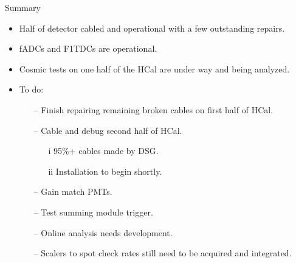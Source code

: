 \documentclass[10pt]{beamer}
\begin{document}
\begin{frame}{Summary}

	\begin{itemize}
		\item Half of detector cabled and operational with a few outstanding repairs.
		\item {}\alert{fADCs and F1TDCs are operational}.
		\item {}\alert{Cosmic tests} on one half of the HCal are under way and being analyzed.
		\item {}\alert{To do}:
		\begin{itemize}
			\item[--] Finish repairing remaining broken cables on first half of HCal.
			\item[--] Cable and debug second half of HCal.
				\begin{itemize}
					\item[i] 95\%+ cables made by DSG.
					\item[ii] Installation to begin shortly.
				\end{itemize}
			\item[--] Gain match PMTs.
			\item[--] Test summing module trigger.
			\item[--] Online analysis needs development.
			\item[--] Scalers to spot check rates still need to be acquired and integrated.
		\end{itemize}
	\end{itemize}

\end{frame}
\end{document}
